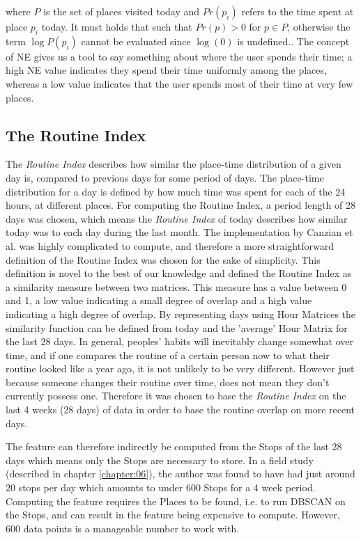 where $P$ is the set of places visited today and $Pr(p_i)$ refers to the time spent at place $p_i$ today. It must holds that such that $Pr(p) > 0$ for $p \in P$, otherwise the term $\log P(p_i)$ cannot be evaluated since $\log(0)$ is undefined.. The concept of NE gives us a tool to say something about where the user spends their time; a high NE value indicates they spend their time uniformly among the places, whereas a low value indicates that the user spends most of their time at very few places. 

\subsection{The Routine Index}
The \textit{Routine Index} describes how similar the place-time distribution of a given day is, compared to previous days for some period of days. The place-time distribution for a day is defined by how much time was spent for each of the 24 hours, at different places. For computing the Routine Index, a period length of 28 days was chosen, which means the \textit{Routine Index} of today describes how similar today was to each day during the last month. The implementation by Canzian et al. \cite{Canzian2015} was highly complicated to compute, and therefore a more straightforward definition of the Routine Index was chosen for the sake of simplicity. This definition is novel to the best of our knowledge and defined the Routine Index as a similarity measure between two matrices. This measure has a value between 0 and 1, a low value indicating a small degree of overlap and a high value indicating a high degree of overlap. By representing days using Hour Matrices the similarity function can be defined from today and the 'average' Hour Matrix for the last 28 days. In general, peoples' habits will inevitably change somewhat over time, and if one compares the routine of a certain person now to what their routine looked like a year ago, it is not unlikely to be very different. However just because someone changes their routine over time, does not mean they don't currently possess one. Therefore it was chosen to base the \textit{Routine Index} on the last 4 weeks (28 days) of data in order to base the routine overlap on more recent days. 

The feature can therefore indirectly be computed from the Stops of the last 28 days which means only the Stops are necessary to store. In a field study (described in chapter \ref{chapter:06}), the author was found to have had just around 20 stops per day which amounts to under 600 Stops for a 4 week period. Computing the feature requires the Places to be found, i.e. to run DBSCAN on the Stops, and can result in the feature being expensive to compute. However, 600 data points is a manageable number to work with.

